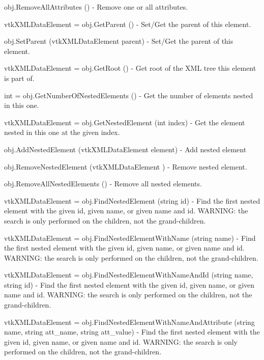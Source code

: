 \begin{DoxyItemize}
\item {\ttfamily obj.\-Remove\-All\-Attributes ()} -\/ Remove one or all attributes.  
\item {\ttfamily vtk\-X\-M\-L\-Data\-Element = obj.\-Get\-Parent ()} -\/ Set/\-Get the parent of this element.  
\item {\ttfamily obj.\-Set\-Parent (vtk\-X\-M\-L\-Data\-Element parent)} -\/ Set/\-Get the parent of this element.  
\item {\ttfamily vtk\-X\-M\-L\-Data\-Element = obj.\-Get\-Root ()} -\/ Get root of the X\-M\-L tree this element is part of.  
\item {\ttfamily int = obj.\-Get\-Number\-Of\-Nested\-Elements ()} -\/ Get the number of elements nested in this one.  
\item {\ttfamily vtk\-X\-M\-L\-Data\-Element = obj.\-Get\-Nested\-Element (int index)} -\/ Get the element nested in this one at the given index.  
\item {\ttfamily obj.\-Add\-Nested\-Element (vtk\-X\-M\-L\-Data\-Element element)} -\/ Add nested element  
\item {\ttfamily obj.\-Remove\-Nested\-Element (vtk\-X\-M\-L\-Data\-Element )} -\/ Remove nested element.  
\item {\ttfamily obj.\-Remove\-All\-Nested\-Elements ()} -\/ Remove all nested elements.  
\item {\ttfamily vtk\-X\-M\-L\-Data\-Element = obj.\-Find\-Nested\-Element (string id)} -\/ Find the first nested element with the given id, given name, or given name and id. W\-A\-R\-N\-I\-N\-G\-: the search is only performed on the children, not the grand-\/children.  
\item {\ttfamily vtk\-X\-M\-L\-Data\-Element = obj.\-Find\-Nested\-Element\-With\-Name (string name)} -\/ Find the first nested element with the given id, given name, or given name and id. W\-A\-R\-N\-I\-N\-G\-: the search is only performed on the children, not the grand-\/children.  
\item {\ttfamily vtk\-X\-M\-L\-Data\-Element = obj.\-Find\-Nested\-Element\-With\-Name\-And\-Id (string name, string id)} -\/ Find the first nested element with the given id, given name, or given name and id. W\-A\-R\-N\-I\-N\-G\-: the search is only performed on the children, not the grand-\/children.  
\item {\ttfamily vtk\-X\-M\-L\-Data\-Element = obj.\-Find\-Nested\-Element\-With\-Name\-And\-Attribute (string name, string att\-\_\-name, string att\-\_\-value)} -\/ Find the first nested element with the given id, given name, or given name and id. W\-A\-R\-N\-I\-N\-G\-: the search is only performed on the children, not the grand-\/children.  

\end{DoxyItemize}
